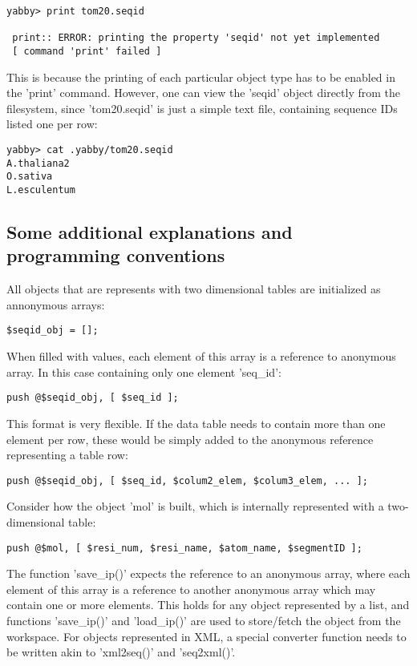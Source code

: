 \begin{verbatim}
yabby> print tom20.seqid

 print:: ERROR: printing the property 'seqid' not yet implemented
 [ command 'print' failed ]
\end{verbatim}

This is because the printing of each particular object type has to
be enabled in the 'print' command. However, one can view the 'seqid'
object directly from the filesystem, since 'tom20.seqid' is just
a simple text file, containing sequence IDs listed one per row:

\begin{verbatim}
yabby> cat .yabby/tom20.seqid
A.thaliana2
O.sativa
L.esculentum
\end{verbatim}

\subsection{Some additional explanations and programming conventions}

All objects that are represents with two dimensional tables are
initialized as annonymous arrays:

\begin{verbatim}
$seqid_obj = [];
\end{verbatim}

When filled with values, each element of this array is a reference
to anonymous array. In this case containing only one element 'seq\_id':

\begin{verbatim}
push @$seqid_obj, [ $seq_id ];
\end{verbatim}

This format is very flexible.  If the data table needs to contain more
than one element per row, these would be simply added to the anonymous
reference representing a table row:

\begin{verbatim}
push @$seqid_obj, [ $seq_id, $colum2_elem, $colum3_elem, ... ];
\end{verbatim}

Consider how the object 'mol' is built, which is internally represented
with a two-dimensional table:

\begin{verbatim}
push @$mol, [ $resi_num, $resi_name, $atom_name, $segmentID ];
\end{verbatim}

The function 'save\_ip()' expects the reference to an anonymous array,
where each element of this array is a reference to another anonymous
array which may contain one or more elements. This holds for any
object represented by a list, and functions 'save\_ip()' and
'load\_ip()' are used to store/fetch the object from the workspace.
For objects represented in XML, a special converter function needs
to be written akin to 'xml2seq()' and 'seq2xml()'.

